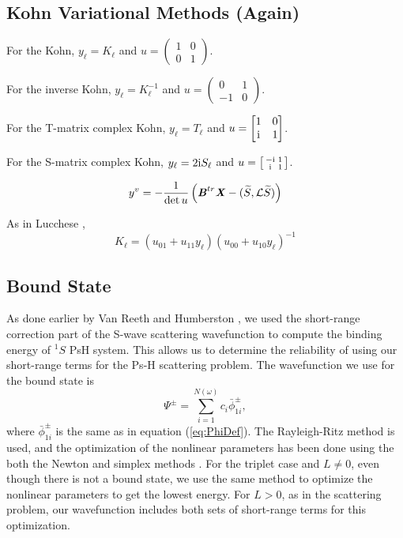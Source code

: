 \documentclass[preprint,showpacs,preprintnumbers,amsmath,amssymb]{revtex4}
\newcommand{\ii}{{\rm{i}}}
\begin{document}
\subsection{Kohn Variational Methods (Again)}
\label{sec:GenKohn}

For the Kohn, $y_\ell = K_\ell$ and $u = \left( \begin{smallmatrix}
1 & 0 \\ 0 & 1
\end{smallmatrix} \right)$.

For the inverse Kohn, $y_\ell = K_\ell^{-1}$ and $u = \left( \begin{smallmatrix}
0 & 1 \\ -1 & 0
\end{smallmatrix} \right)$.

For the T-matrix complex Kohn, $y_\ell = T_\ell$ and $u = \begin{bmatrix}
1 & 0 \\ \ii & 1
\end{bmatrix}$.

For the S-matrix complex Kohn, $y_\ell = 2\ii S_\ell$ and $u = \left[ \begin{smallmatrix}
-\ii & 1 \\ \ii & 1
\end{smallmatrix} \right]$.

\begin{equation}
y^v = -\frac{1}{\det u} \left( \textbf{\emph{B}}^{tr} \textbf{\emph{X}} - (\widetilde{S},\mathcal{L} \widetilde{S}) \right)
\end{equation}

As in Lucchese \cite{},
\begin{equation}
K_\ell = (u_{01} + u_{11} y_\ell)(u_{00} + u_{10} y_\ell)^{-1}
\end{equation}



\subsection{Bound State}
As done earlier by Van Reeth and Humberston \cite{VanReeth2003,VanReeth2004}, we used the short-range correction part of the S-wave scattering wavefunction to compute the binding energy of $^1S$ PsH system. This allows us to determine the reliability of using our short-range terms for the Ps-H scattering problem. The wavefunction we use for the bound state is
\begin{equation}
\label{eq:BoundWavefn}
\Psi^\pm = \sum_{i=1}^{N(\omega)} c_i \bar{\phi}_{1i}^\pm,
\end{equation}
where $\bar{\phi}_{1i}^\pm$ is the same as in equation (\ref{eq:PhiDef}). The Rayleigh-Ritz method is used, and the optimization of the nonlinear parameters has been done using the both the Newton and simplex methods \cite{Yan1999,GSL}. For the triplet case and $L \neq 0$, even though there is not a bound state, we use the same method to optimize the nonlinear parameters to get the lowest energy. For $L > 0$, as in the scattering problem, our wavefunction includes both sets of short-range terms for this optimization.
\end{document}
